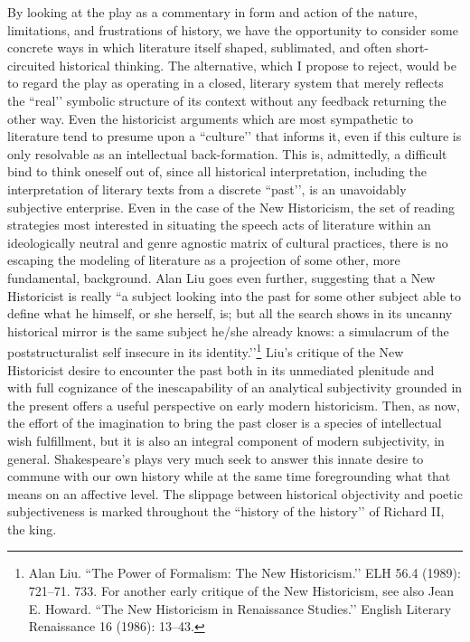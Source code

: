 By looking at the play as a commentary in form and action of the nature, limitations, and frustrations of history, we have the opportunity to consider some concrete ways in which literature itself shaped, sublimated, and often short-circuited historical thinking.
The alternative, which I propose to reject, would be to regard the play as operating in a closed, literary system that merely reflects the ``real’’ symbolic structure of its context without any feedback returning the other way.
Even the historicist arguments which are most sympathetic to literature tend to presume upon a ``culture’’ that informs it, even if this culture is only resolvable as an intellectual back-formation.
This is, admittedly, a difficult bind to think oneself out of, since all historical interpretation, including the interpretation of literary texts from a discrete ``past’’, is an unavoidably subjective enterprise.
Even in the case of the New Historicism, the set of reading strategies most interested in situating the speech acts of literature within an ideologically neutral and genre agnostic matrix of cultural practices, there is no escaping the modeling of literature as a projection of some other, more fundamental, background.
Alan Liu goes even further, suggesting that a New Historicist is really ``a subject looking into the past for some other subject able to define what he himself, or she herself, is; but all the search shows in its uncanny historical mirror is the same subject he/she already knows: a simulacrum of the poststructuralist self insecure in its identity.’’\footnote{Alan Liu. ``The Power of Formalism: The New Historicism.’’ ELH 56.4 (1989): 721--71. 733. For another early critique of the New Historicism, see also Jean E. Howard. ``The New Historicism in Renaissance Studies.’’ English Literary Renaissance 16 (1986): 13--43.} Liu’s critique of the New Historicist desire to encounter the past both in its unmediated plenitude and with full cognizance of the inescapability of an analytical subjectivity grounded in the present offers a useful perspective on early modern historicism.
Then, as now, the effort of the imagination to bring the past closer is a species of intellectual wish fulfillment, but it is also an integral component of modern subjectivity, in general.
Shakespeare’s plays very much seek to answer this innate desire to commune with our own history while at the same time foregrounding what that means on an affective level.
The slippage between historical objectivity and poetic subjectiveness is marked throughout the ``history of the history’’ of Richard II, the king.
